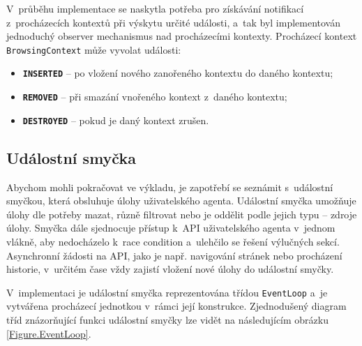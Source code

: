 V~průběhu implementace se naskytla potřeba pro získávání notifikací z~procházecích kontextů při výskytu určité události, a~tak byl implementován jednoduchý observer mechanismus nad procházecími kontexty. Procházecí kontext \texttt{BrowsingContext} může vyvolat události:

\begin{itemize}
  \item \textbf{\texttt{INSERTED}} -- po vložení nového zanořeného kontextu do daného kontextu;
  \item \textbf{\texttt{REMOVED}} -- při smazání vnořeného kontext z~daného kontextu;
  \item \textbf{\texttt{DESTROYED}} -- pokud je daný kontext zrušen. 
\end{itemize}

\subsection{Událostní smyčka}
\label{Chapter.Implementation.EventLoop}

Abychom mohli pokračovat ve výkladu, je zapotřebí se seznámit s~událostní smyčkou, která obsluhuje úlohy uživatelského agenta. Událostní smyčka umožňuje úlohy dle potřeby mazat, různě filtrovat nebo je oddělit podle jejich typu -- zdroje úlohy. Smyčka dále sjednocuje přístup k~API uživatelského agenta v~jednom vlákně, aby nedocházelo k~race condition a~ulehčilo se řešení výlučných sekcí. Asynchronní žádosti na API, jako je např. navigování stránek nebo procházení historie, v~určitém čase vždy zajistí vložení nové úlohy do událostní smyčky.

V~implementaci je událostní smyčka reprezentována třídou \texttt{EventLoop} a~je vytvářena procházecí jednotkou v~rámci její konstrukce. Zjednodušený diagram tříd znázorňující funkci událostní smyčky lze vidět na následujícím obrázku \ref{Figure.EventLoop}. 

